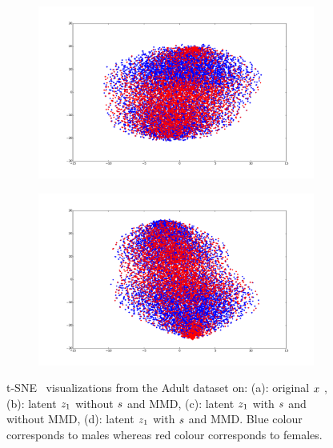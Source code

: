 \begin{figure}[h]
\begin{subfigure}{.25\textwidth}
        \caption{}
        \label{fig:tsne_adult}
    \end{subfigure}%
    \begin{subfigure}{.25\textwidth}
        \centering
        \includegraphics[width=1.\textwidth]{tsne_adult_s.pdf}
        \caption{}
        \label{fig:tsne_adult_s}
    \end{subfigure}%
    \begin{subfigure}{.25\textwidth}
        \centering
        \includegraphics[width=1.\textwidth]{tsne_adult_mmd_s.pdf}
        \caption{}
        \label{fig:tsne_adult_mmd_s}
    \end{subfigure}%
    \caption{t-SNE~\citep{2013arXiv1301.3342V} visualizations from the Adult dataset on: (a): original $\*x$ , (b):  latent $\*z_1$  without $\*s$ and MMD, (c): latent $\*z_1$ with $\*s$ and without MMD, (d):  latent $\*z_1$ with $\*s$ and MMD. Blue colour corresponds to males whereas red colour corresponds to females.}
    \label{fig:tsne_adult_all}
\end{figure}

